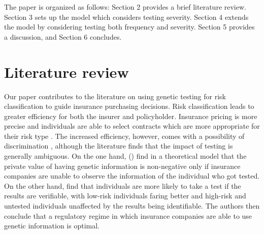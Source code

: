 \documentclass[natbib=false,preprint,12pt]{elsarticle}
\theoremstyle{plain}
\theoremstyle{definition}
\theoremstyle{plain}
\theoremstyle{TheoremNum}
\theoremstyle{CorollaryNum}
\theoremstyle{PropositionNum}
\theoremstyle{TheoremNum}
\begin{document}

The paper is organized as follows: Section 2 provides a brief literature review. Section 3 sets up the model which considers testing severity. Section 4 extends the model by considering testing both frequency and severity. Section 5 provides a discussion, and Section 6 concludes.

\section{Literature review}

Our paper contributes to the literature on using genetic testing for risk classification to guide insurance purchasing decisions. Risk classification leads to greater efficiency for both the insurer and policyholder. Insurance pricing is more precise and individuals are able to select contracts which are more appropriate for their risk type \autocite{finkelstein2004adverse}. The increased efficiency, however, comes with a possibility of discrimination \autocite{crocker1986efficiency}, although the literature finds that the impact of testing is generally ambiguous. On the one hand, \citeauthor{doherty1996adverse} (\citeyear{doherty1996adverse}) find in a theoretical model that the private value of having genetic information is non-negative only if insurance companies are unable to observe the information of the individual who got tested. On the other hand, \textcite{hoel2006genetic} find that individuals are more likely to take a test if the results are verifiable, with low-risk individuals faring better and high-risk and untested individuals unaffected by the results being identifiable. The authors then conclude that a regulatory regime in which insurance companies are able to use genetic information is optimal. 
\end{document}
